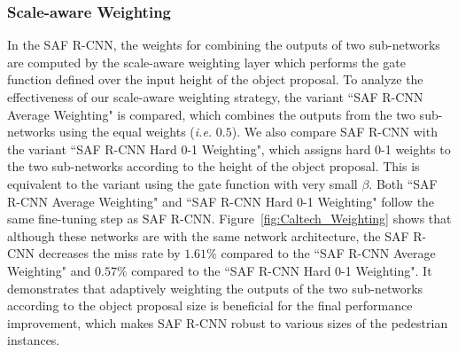 \documentclass[journal]{IEEEtran}
\begin{document}
\subsubsection{Scale-aware Weighting}
In the SAF R-CNN, the weights for combining the outputs of two sub-networks are computed by the scale-aware weighting layer which performs the gate function defined over the input height of the object proposal. To analyze the effectiveness of our scale-aware weighting strategy, the variant ``SAF R-CNN Average Weighting" is compared, which combines the outputs from the two sub-networks using the equal weights (\emph{i.e.} $0.5$). We also compare SAF R-CNN with the variant ``SAF R-CNN Hard 0-1 Weighting", which assigns hard 0-1 weights to the two sub-networks according to the height of the object proposal. This is equivalent to the variant using the gate function with very small $\beta$. Both ``SAF R-CNN Average Weighting" and ``SAF R-CNN Hard 0-1 Weighting" follow the same fine-tuning step as SAF R-CNN. Figure~\ref{fig:Caltech_Weighting} shows that although these networks are with the same network architecture, the SAF R-CNN decreases the miss rate by $1.61\%$ compared to the ``SAF R-CNN Average Weighting" and $0.57\%$ compared to the ``SAF R-CNN Hard 0-1 Weighting". It demonstrates that adaptively weighting the outputs of the two sub-networks according to the object proposal size is beneficial for the final performance improvement, which makes SAF R-CNN robust to various sizes of the pedestrian instances.

\end{document}
